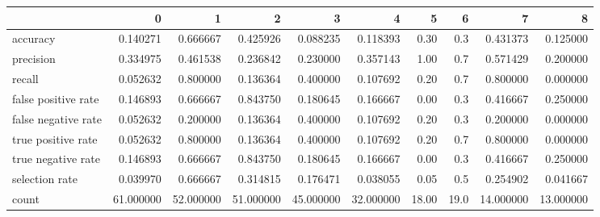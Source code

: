 \begin{tabular}{lrrrrrrrrr}
\toprule
{} &          0 &          1 &          2 &          3 &          4 &      5 &     6 &          7 &          8 \\
\midrule
accuracy            &   0.140271 &   0.666667 &   0.425926 &   0.088235 &   0.118393 &   0.30 &   0.3 &   0.431373 &   0.125000 \\
precision           &   0.334975 &   0.461538 &   0.236842 &   0.230000 &   0.357143 &   1.00 &   0.7 &   0.571429 &   0.200000 \\
recall              &   0.052632 &   0.800000 &   0.136364 &   0.400000 &   0.107692 &   0.20 &   0.7 &   0.800000 &   0.000000 \\
false positive rate &   0.146893 &   0.666667 &   0.843750 &   0.180645 &   0.166667 &   0.00 &   0.3 &   0.416667 &   0.250000 \\
false negative rate &   0.052632 &   0.200000 &   0.136364 &   0.400000 &   0.107692 &   0.20 &   0.3 &   0.200000 &   0.000000 \\
true positive rate  &   0.052632 &   0.800000 &   0.136364 &   0.400000 &   0.107692 &   0.20 &   0.7 &   0.800000 &   0.000000 \\
true negative rate  &   0.146893 &   0.666667 &   0.843750 &   0.180645 &   0.166667 &   0.00 &   0.3 &   0.416667 &   0.250000 \\
selection rate      &   0.039970 &   0.666667 &   0.314815 &   0.176471 &   0.038055 &   0.05 &   0.5 &   0.254902 &   0.041667 \\
count               &  61.000000 &  52.000000 &  51.000000 &  45.000000 &  32.000000 &  18.00 &  19.0 &  14.000000 &  13.000000 \\
\bottomrule
\end{tabular}
